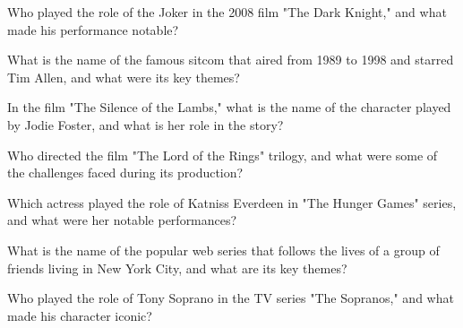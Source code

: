 \documentclass[12pt,a4paper]{book}
\begin{document}
\begin{enhancedmcq}[Question 28]{Who played the role of the Joker in the 2008 film "The Dark Knight," and what made his performance notable?}
\end{enhancedmcq}

\begin{enhancedmcq}[Question 29]{What is the name of the famous sitcom that aired from 1989 to 1998 and starred Tim Allen, and what were its key themes?}
\end{enhancedmcq}

\begin{enhancedmcq}[Question 30]{In the film "The Silence of the Lambs," what is the name of the character played by Jodie Foster, and what is her role in the story?}
\end{enhancedmcq}

\begin{enhancedmcq}[Question 31]{Who directed the film "The Lord of the Rings" trilogy, and what were some of the challenges faced during its production?}
\end{enhancedmcq}

\begin{enhancedmcq}[Question 32]{Which actress played the role of Katniss Everdeen in "The Hunger Games" series, and what were her notable performances?}
\end{enhancedmcq}

\begin{enhancedmcq}[Question 33]{What is the name of the popular web series that follows the lives of a group of friends living in New York City, and what are its key themes?}
\end{enhancedmcq}

\begin{enhancedmcq}[Question 34]{Who played the role of Tony Soprano in the TV series "The Sopranos," and what made his character iconic?}
\end{enhancedmcq}
\end{document}
